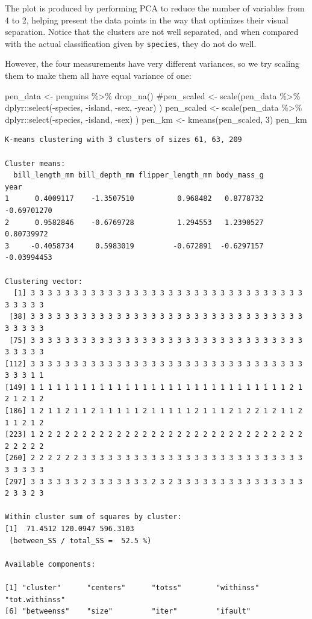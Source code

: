 \documentclass[
  letterpaper,
  DIV=11,
  numbers=noendperiod]{scrreprt}
\newenvironment{Shaded}{\begin{snugshade}}{\end{snugshade}}
\newcommand{\CommentTok}[1]{\textcolor[rgb]{0.37,0.37,0.37}{#1}}
\newcommand{\DecValTok}[1]{\textcolor[rgb]{0.68,0.00,0.00}{#1}}
\newcommand{\FunctionTok}[1]{\textcolor[rgb]{0.28,0.35,0.67}{#1}}
\newcommand{\NormalTok}[1]{\textcolor[rgb]{0.00,0.23,0.31}{#1}}
\newcommand{\OtherTok}[1]{\textcolor[rgb]{0.00,0.23,0.31}{#1}}
\newcommand{\SpecialCharTok}[1]{\textcolor[rgb]{0.37,0.37,0.37}{#1}}
\begin{document}
The plot is produced by performing PCA to reduce the number of variables
from 4 to 2, helping present the data points in the way that optimizes
their visual separation. Notice that the clusters are not well
separated, and when compared with the actual classification given by
\texttt{species}, they do not do well.

However, the four measurements have very different variances, so we try
scaling them to make them all have equal variance of one:

\begin{Shaded}
\begin{Highlighting}[]
\NormalTok{pen\_data }\OtherTok{\textless{}{-}}\NormalTok{ penguins }\SpecialCharTok{\%\textgreater{}\%} \FunctionTok{drop\_na}\NormalTok{()}
\CommentTok{\#pen\_scaled \textless{}{-} scale(pen\_data \%\textgreater{}\% dplyr::select({-}species, {-}island, {-}sex, {-}year) )}
\NormalTok{pen\_scaled }\OtherTok{\textless{}{-}} \FunctionTok{scale}\NormalTok{(pen\_data }\SpecialCharTok{\%\textgreater{}\%}\NormalTok{ dplyr}\SpecialCharTok{::}\FunctionTok{select}\NormalTok{(}\SpecialCharTok{{-}}\NormalTok{species, }\SpecialCharTok{{-}}\NormalTok{island, }\SpecialCharTok{{-}}\NormalTok{sex) )}
\NormalTok{pen\_km }\OtherTok{\textless{}{-}} \FunctionTok{kmeans}\NormalTok{(pen\_scaled, }\DecValTok{3}\NormalTok{)}
\NormalTok{pen\_km}
\end{Highlighting}
\end{Shaded}

\begin{verbatim}
K-means clustering with 3 clusters of sizes 61, 63, 209

Cluster means:
  bill_length_mm bill_depth_mm flipper_length_mm body_mass_g        year
1      0.4009117    -1.3507510          0.968482   0.8778732 -0.69701270
2      0.9582846    -0.6769728          1.294553   1.2390527  0.80739972
3     -0.4058734     0.5983019         -0.672891  -0.6297157 -0.03994453

Clustering vector:
  [1] 3 3 3 3 3 3 3 3 3 3 3 3 3 3 3 3 3 3 3 3 3 3 3 3 3 3 3 3 3 3 3 3 3 3 3 3 3
 [38] 3 3 3 3 3 3 3 3 3 3 3 3 3 3 3 3 3 3 3 3 3 3 3 3 3 3 3 3 3 3 3 3 3 3 3 3 3
 [75] 3 3 3 3 3 3 3 3 3 3 3 3 3 3 3 3 3 3 3 3 3 3 3 3 3 3 3 3 3 3 3 3 3 3 3 3 3
[112] 3 3 3 3 3 3 3 3 3 3 3 3 3 3 3 3 3 3 3 3 3 3 3 3 3 3 3 3 3 3 3 3 3 3 3 1 1
[149] 1 1 1 1 1 1 1 1 1 1 1 1 1 1 1 1 1 1 1 1 1 1 1 1 1 1 1 1 1 1 2 1 2 1 2 1 2
[186] 1 2 1 1 2 1 1 2 1 1 1 1 1 2 1 1 1 1 1 2 1 1 1 2 1 2 2 1 2 1 1 2 1 1 2 1 2
[223] 1 2 2 2 2 2 2 2 2 2 2 2 2 2 2 2 2 2 2 2 2 2 2 2 2 2 2 2 2 2 2 2 2 2 2 2 2
[260] 2 2 2 2 2 2 3 3 3 3 3 3 3 3 3 3 3 3 3 3 3 3 3 3 3 3 3 3 3 3 3 3 3 3 3 3 3
[297] 3 3 3 3 3 3 2 3 3 3 3 3 3 3 2 3 2 3 3 3 3 3 3 3 3 3 3 3 3 3 3 3 2 3 3 2 3

Within cluster sum of squares by cluster:
[1]  71.4512 120.0947 596.3103
 (between_SS / total_SS =  52.5 %)

Available components:

[1] "cluster"      "centers"      "totss"        "withinss"     "tot.withinss"
[6] "betweenss"    "size"         "iter"         "ifault"      
\end{verbatim}
\end{document}
